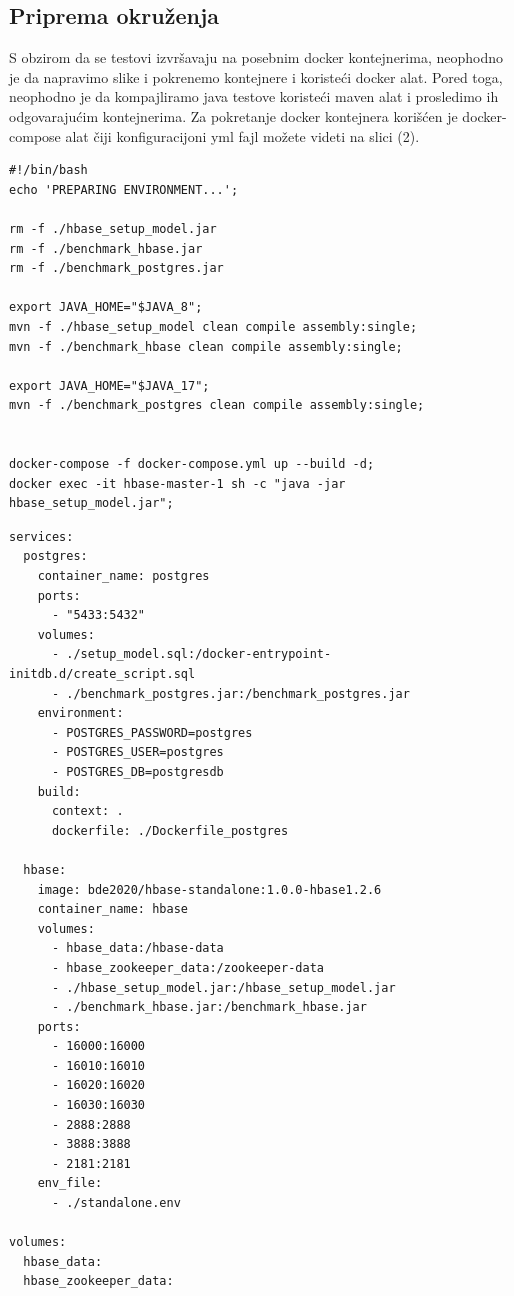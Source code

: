 \documentclass[12pt,oneside]{memoir}
\begin{document}
\subsection{Priprema okruženja}

S obzirom da se testovi izvršavaju na posebnim docker kontejnerima, neophodno je da napravimo slike i pokrenemo kontejnere i koristeći docker alat. Pored toga, neophodno je da kompajliramo java testove koristeći maven alat i prosledimo ih odgovarajućim  kontejnerima. Za pokretanje docker kontejnera korišćen je docker-compose alat čiji konfiguracijoni yml fajl možete videti na slici (2).



\begin{lstlisting}[title={prepareEnv.sh},captionpos=t]
#!/bin/bash
echo 'PREPARING ENVIRONMENT...';

rm -f ./hbase_setup_model.jar
rm -f ./benchmark_hbase.jar
rm -f ./benchmark_postgres.jar

export JAVA_HOME="$JAVA_8";
mvn -f ./hbase_setup_model clean compile assembly:single;
mvn -f ./benchmark_hbase clean compile assembly:single;

export JAVA_HOME="$JAVA_17";
mvn -f ./benchmark_postgres clean compile assembly:single;


docker-compose -f docker-compose.yml up --build -d;
docker exec -it hbase-master-1 sh -c "java -jar hbase_setup_model.jar";

\end{lstlisting}


\begin{lstlisting}[title={docker-compose.yml},captionpos=t]
services: 
  postgres:
    container_name: postgres
    ports:
      - "5433:5432"
    volumes:
      - ./setup_model.sql:/docker-entrypoint-initdb.d/create_script.sql
      - ./benchmark_postgres.jar:/benchmark_postgres.jar
    environment:
      - POSTGRES_PASSWORD=postgres
      - POSTGRES_USER=postgres
      - POSTGRES_DB=postgresdb
    build:
      context: .
      dockerfile: ./Dockerfile_postgres

  hbase:
    image: bde2020/hbase-standalone:1.0.0-hbase1.2.6
    container_name: hbase
    volumes:
      - hbase_data:/hbase-data
      - hbase_zookeeper_data:/zookeeper-data
      - ./hbase_setup_model.jar:/hbase_setup_model.jar
      - ./benchmark_hbase.jar:/benchmark_hbase.jar
    ports:
      - 16000:16000
      - 16010:16010
      - 16020:16020
      - 16030:16030
      - 2888:2888
      - 3888:3888
      - 2181:2181
    env_file:
      - ./standalone.env

volumes:
  hbase_data:
  hbase_zookeeper_data:
\end{lstlisting}
\end{document}
